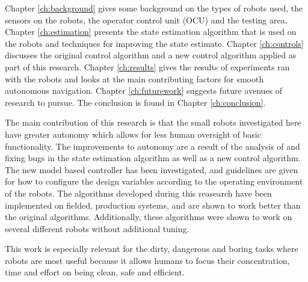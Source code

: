Chapter \ref{ch:background} gives some background on the types of robots used, the sensors on the robots, the operator control unit (OCU) and the testing area. Chapter \ref{ch:estimation} presents the state estimation algorithm that is used on the robots and techniques for improving the state estimate. Chapter \ref{ch:controls} discusses the original control algorithm and a new control algorithm applied as part of this research. Chapter \ref{ch:results} gives the results of experiments ran with the robots and looks at the main contributing factors for smooth autonomous navigation. Chapter \ref{ch:futurework} suggests future avenues of research to pursue. The conclusion is found in Chapter \ref{ch:conclusion}.

The main contribution of this research is that the small robots investigated here have greater autonomy which allows for less human oversight of basic functionality. The improvements to autonomy are a result of the analysis of and fixing bugs in the state estimation algorithm as well as a new control algorithm. The new model based controller has been investigated, and guidelines are given for how to configure the design variables according to the operating environment of the robots. The algorithms developed during this reasearch have been implemented on fielded, production systems, and are shown to work better than the original algorithms. Additionally, these algorithms were shown to work on several different robots without additional tuning.

This work is especially relevant for the dirty, dangerous and boring tasks where robots are most useful because it allows humans to focus their concentration, time and effort on being clean, safe and efficient.
